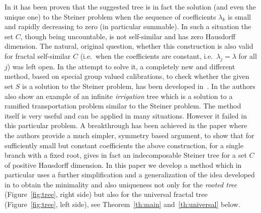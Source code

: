 \documentclass{amsart}
\theoremstyle{definition}
\theoremstyle{remark}
\begin{document}
In \cite{PaoSteTep15} it has been proven that 
the suggested tree is in fact the solution (and even the unique one) 
to the Steiner problem when the sequence of coefficients $\lambda_k$
is small and rapidly decreasing to zero (in particular summable).
In such a situation the set $C$, though being uncountable,
is not self-similar and has zero Hausdorff dimension.
The natural, original question, whether this construction is also valid 
for fractal self-similar $C$ (i.e.\ when the coefficients are constant,
i.e.\ $\lambda_j=\lambda$ for all $j$)
was left open.
In the attempt to solve it, a 
completely new and different method, based on special group valued calibrations,
to check whether the given set $S$ is a solution to the Steiner problem,
has been developed in~\cite{MarMas16a}.
In \cite{MarMas16b} the authors also show an example 
of an infinite \emph{irrigation} tree which is a solution to
a ramified transportation problem similar to the Steiner problem.
The method itself is very useful and can be applied in many situations.
However it failed in this particular problem.
A breakthrough has been achieved in the paper \cite{CheTep23}
where the authors provide a much simpler, symmetry based argument, to show that for 
sufficiently small but constant coefficients the above construction,
for a single branch with a fixed root,
gives in fact an indecomposable Steiner tree for a set $C$ 
of positive Hausdorff dimension.
In this paper we develop a method which in particular uses 
a further simplification and a generalization of 
the idea developed in \cite{CheTep23} to obtain the minimality and also uniqueness 
not only for the \emph{rooted tree} (Figure~\ref{fig:tree}, right side) 
but also for the universal fractal tree (Figure~\ref{fig:tree}, left side), 
see Theorem~\ref{th:main} and~\ref{th:universal} below.
\end{document}
